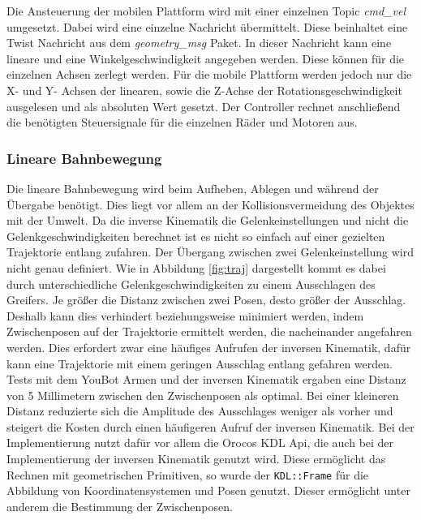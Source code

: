 Die Ansteuerung der mobilen Plattform wird mit einer einzelnen Topic \textit{cmd\_vel} umgesetzt. Dabei wird eine einzelne Nachricht übermittelt. Diese beinhaltet eine Twist Nachricht aus dem \textit{geometry\_msg} Paket. In dieser Nachricht kann eine lineare und eine Winkelgeschwindigkeit angegeben werden. Diese können für die einzelnen Achsen zerlegt werden. Für die mobile Plattform werden jedoch nur die X- und Y- Achsen der linearen, sowie die Z-Achse der Rotationsgeschwindigkeit ausgelesen und als absoluten Wert gesetzt. Der Controller rechnet anschließend die benötigten Steuersignale für die einzelnen Räder und Motoren aus.

\subsubsection{Lineare Bahnbewegung}
Die lineare Bahnbewegung wird beim Aufheben, Ablegen und während der Übergabe benötigt. Dies liegt vor allem an der Kollisionsvermeidung des Objektes mit der Umwelt. Da die inverse Kinematik die Gelenkeinstellungen und nicht die Gelenkgeschwindigkeiten berechnet ist es nicht so einfach auf einer gezielten Trajektorie entlang zufahren. Der Übergang zwischen zwei Gelenkeinstellung wird nicht genau definiert. Wie in Abbildung \ref{fig:traj} dargestellt kommt es dabei durch unterschiedliche Gelenkgeschwindigkeiten zu einem Ausschlagen des Greifers. Je größer die Distanz zwischen zwei Posen, desto größer der Ausschlag. Deshalb kann dies verhindert beziehungsweise minimiert werden, indem Zwischenposen auf der Trajektorie ermittelt werden, die nacheinander angefahren werden. Dies erfordert zwar eine häufiges Aufrufen der inversen Kinematik, dafür kann eine Trajektorie mit einem geringen Ausschlag entlang gefahren werden. Tests mit dem YouBot Armen und der inversen Kinematik ergaben eine Distanz von 5 Millimetern zwischen den Zwischenposen als optimal. Bei einer kleineren Distanz reduzierte sich die Amplitude des Ausschlages weniger als vorher und steigert die Kosten durch einen häufigeren Aufruf der inversen Kinematik. Bei der Implementierung nutzt dafür vor allem die Orocos KDL Api, die auch bei der Implementierung der inversen Kinematik genutzt wird. Diese ermöglicht das Rechnen mit geometrischen Primitiven, so wurde der \lstinline|KDL::Frame| für die Abbildung von Koordinatensystemen und Posen genutzt. Dieser ermöglicht unter anderem die Bestimmung der Zwischenposen.

